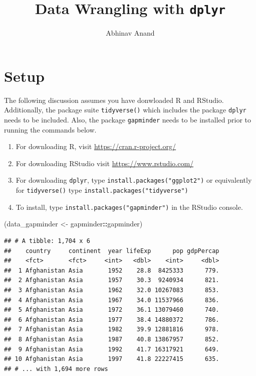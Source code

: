 \documentclass[12pt,]{article}
\title{Data Wrangling with \texttt{dplyr}}
\author{Abhinav Anand}
\date{}
\newenvironment{Shaded}{\begin{snugshade}}{\end{snugshade}}
\newcommand{\StringTok}[1]{\textcolor[rgb]{0.31,0.60,0.02}{#1}}
\newcommand{\OperatorTok}[1]{\textcolor[rgb]{0.81,0.36,0.00}{\textbf{#1}}}
\newcommand{\NormalTok}[1]{#1}
\providecommand{\tightlist}{%
  \setlength{\itemsep}{0pt}\setlength{\parskip}{0pt}}
\begin{document}
\maketitle

\section{Setup}\label{setup}

The following discussion assumes you have donwloaded R and RStudio.
Additionally, the package suite \texttt{tidyverse()} which includes the
package \texttt{dplyr} needs to be included. Also, the package
\texttt{gapminder} needs to be installed prior to running the commands
below.

\begin{enumerate}
\def\labelenumi{\arabic{enumi}.}
\tightlist
\item
  For downloading R, visit \url{https://cran.r-project.org/}
\item
  For downloading RStudio visit \url{https://www.rstudio.com/}
\item
  For downloading \texttt{dplyr}, type
  \texttt{install.packages("ggplot2")} or equivalently for
  \texttt{tidyverse()} type \texttt{install.packages("tidyverse")}
\item
  To install, type \texttt{install.packages("gapminder")} in the RStudio
  console.
\end{enumerate}

\begin{Shaded}
\begin{Highlighting}[]
\NormalTok{(data_gapminder <-}\StringTok{ }\NormalTok{gapminder}\OperatorTok{::}\NormalTok{gapminder)}
\end{Highlighting}
\end{Shaded}

\begin{verbatim}
## # A tibble: 1,704 x 6
##    country     continent  year lifeExp      pop gdpPercap
##    <fct>       <fct>     <int>   <dbl>    <int>     <dbl>
##  1 Afghanistan Asia       1952    28.8  8425333      779.
##  2 Afghanistan Asia       1957    30.3  9240934      821.
##  3 Afghanistan Asia       1962    32.0 10267083      853.
##  4 Afghanistan Asia       1967    34.0 11537966      836.
##  5 Afghanistan Asia       1972    36.1 13079460      740.
##  6 Afghanistan Asia       1977    38.4 14880372      786.
##  7 Afghanistan Asia       1982    39.9 12881816      978.
##  8 Afghanistan Asia       1987    40.8 13867957      852.
##  9 Afghanistan Asia       1992    41.7 16317921      649.
## 10 Afghanistan Asia       1997    41.8 22227415      635.
## # ... with 1,694 more rows
\end{verbatim}
\end{document}

